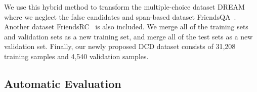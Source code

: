 We use this hybrid method to transform the multiple-choice dataset DREAM~\cite{sun2019dream} where we neglect the false candidates and span-based dataset FriendsQA~\cite{yang2019friendsqa}. Another dataset FriendsRC~\cite{ma2018challenging} is also included. We merge all of the training sets and validation sets as a new training set, and merge all of the test sets as a new validation set. Finally, our newly proposed DCD dataset consists of 31,208 training samples and 4,540 validation samples.







\subsection{Automatic Evaluation}\label{sec:automaticevaluation}


